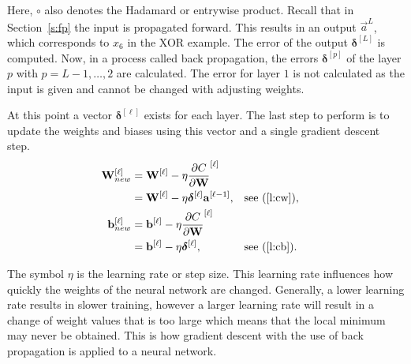 Here, \(\circ \) also denotes the Hadamard or entrywise product.
Recall that in Section~\ref{s:fp} the input is propagated forward. This results in an output \(\vec{a}^L\), which corresponds to \(x_6\) in the XOR example.
The error of the output \(\bm{\delta}^{[L]}\) is computed.
Now, in a process called back propagation, the errors \(\bm{\delta}^{[p]}\) of the layer \(p\) with \(p = L - 1, \ldots, 2\) are calculated.
The error for layer \(1\) is not calculated as the input is given and cannot be changed with adjusting weights.

At this point a vector \(\bm{\delta}^{[\ell]}\) exists for each layer.
The last step to perform is to update the weights and biases using this vector and a single gradient descent step.
\begin{align*}
    \mathbf{W}^{[\ell]}_{new} &= \mathbf{W}^{[\ell]} - \eta \frac{\partial C}{\partial \mathbf{W}}^{[\ell]}\\ 
    &= \mathbf{W}^{[\ell]} - \eta \bm{\delta}^{[\ell]}\mathbf{a}^{[\ell - 1]}, && \text{see (\ref{l:cw}),}\\
    \mathbf{b}^{[\ell]}_{new} &= \mathbf{b}^{[\ell]} - \eta \frac{\partial C}{\partial \mathbf{W}}^{[\ell]}\\ 
    &= \mathbf{b}^{[\ell]} - \eta \bm{\delta}^{[\ell]}, && \text{see (\ref{l:cb}).}
\end{align*}

The symbol \(\eta \) is the learning rate or step size.
This learning rate influences how quickly the weights of the neural network are changed.
Generally, a lower learning rate results in slower training, however a larger learning rate will result in a change of weight values that is too large which means that the local minimum may never be obtained.
This is how gradient descent with the use of back propagation is applied to a neural network.


